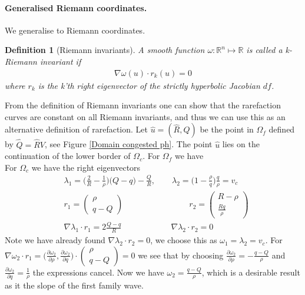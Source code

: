 \documentclass{article}
\newtheorem{definition}{Definition}[section]
\numberwithin{equation}{section}
\begin{document}
\paragraph{Generalised Riemann coordinates.}
We generalise to Riemann coordinates. 
\begin{definition}[Riemann invariants]
A smooth function $\omega : \mathbb{R}^n \mapsto \mathbb{R}$ is called a \textit{k-Riemann invariant} if 
\begin{align*}
    \nabla \omega(u) \cdot r_k (u) = 0
\end{align*}
where $r_k$ is the k'th right eigenvector of the strictly hyperbolic Jacobian $df$.
\end{definition}
From the definition of Riemann invariants one can show that the rarefaction curves are constant on all Riemann invariants, and thus we can use this as an alternative definition of rarefaction. 
Let $\hat u = (\hat R, \hat Q)$ be the point in $\Omega_f$ defined by $\hat Q = \hat R V$, see Figure \ref{Domain congested ph}. The point $\hat u$ lies on the continuation of the lower border of $\Omega_c$.  
For $\Omega_f$ we have \\
For $\Omega_c$ we have the right eigenvectors
\begin{align*}
    &\lambda_1 = \big ( \frac{2}{R} - \frac{1}{\rho} )\big (Q- q) - \frac{Q}{R}, \quad \quad \lambda_2 = \big(1 - \frac{\rho}{q}\big)\frac{q}{\rho} = v_c \\
    & r_1 = \begin{pmatrix} \rho \\ q - Q \end{pmatrix} \quad \quad \quad  \quad \quad \quad \quad \quad  r_2 = \begin{pmatrix} R - \rho \\ \frac{Rq}{\rho} \end{pmatrix} \\
    & \nabla \lambda_1 \cdot r_1 = 2\frac{Q-q}{R} \quad \quad \quad \quad \quad  \quad \nabla \lambda_2 \cdot r_2 = 0
\end{align*}
Note we have already found $\nabla \lambda_2 \cdot r_2 = 0$, we choose this as $\omega_1 = \lambda_2 = v_c$. For $\nabla \omega_2 \cdot r_1 = \big ( \frac{\partial \omega_2}{\partial \rho}, \frac{\partial \omega_2}{\partial q} \big ) \cdot \begin{pmatrix} \rho \\ q - Q \end{pmatrix} = 0 $ we see that by choosing  $\frac{\partial \omega_2}{\partial \rho} = - \frac{ q-Q }{\rho}$ and $ \frac{\partial \omega_2}{\partial q} =  \frac{1}{\rho} $ the expressions cancel. Now we have    $\omega_2 = \frac{q-Q}{\rho}$, which is a desirable result as it the slope of the first family wave. 
\end{document}
